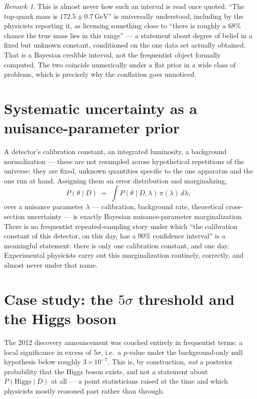 \documentclass[11pt]{book}
\theoremstyle{definition}
\theoremstyle{plain}
\theoremstyle{remark}
\newtheorem{remark}[definition]{Remark}
\begin{document}
\begin{remark}
This is almost never how such an interval is read once quoted. ``The top-quark mass is $172.5 \pm 0.7\ \mathrm{GeV}$'' is universally understood, including by the physicists reporting it, as licensing something close to ``there is roughly a 68\% chance the true mass lies in this range'' --- a statement about degree of belief in a fixed but unknown constant, conditioned on the one data set actually obtained. That is a Bayesian credible interval, not the frequentist object formally computed. The two coincide numerically under a flat prior in a wide class of problems, which is precisely why the conflation goes unnoticed.
\end{remark}

\section{Systematic uncertainty as a nuisance-parameter prior}

A detector's calibration constant, an integrated luminosity, a background normalization --- these are not resampled across hypothetical repetitions of the universe; they are fixed, unknown quantities specific to the one apparatus and the one run at hand. Assigning them an error distribution and marginalizing,
\begin{equation}
P(\theta \mid D) \;=\; \int P(\theta \mid D, \lambda)\,\pi(\lambda)\, d\lambda,
\end{equation}
over a nuisance parameter $\lambda$ --- calibration, background rate, theoretical cross-section uncertainty --- is exactly Bayesian nuisance-parameter marginalization. There is no frequentist repeated-sampling story under which ``the calibration constant of this detector, on this day, has a 90\% confidence interval'' is a meaningful statement: there is only one calibration constant, and one day. Experimental physicists carry out this marginalization routinely, correctly, and almost never under that name.

\section{Case study: the $5\sigma$ threshold and the Higgs boson}

The 2012 discovery announcement was couched entirely in frequentist terms: a local significance in excess of $5\sigma$, i.e.\ a $p$-value under the background-only null hypothesis below roughly $3\times10^{-7}$. This is, by construction, \emph{not} a posterior probability that the Higgs boson exists, and not a statement about $P(\text{Higgs} \mid D)$ at all --- a point statisticians raised at the time and which physicists mostly reasoned past rather than through.
\end{document}
